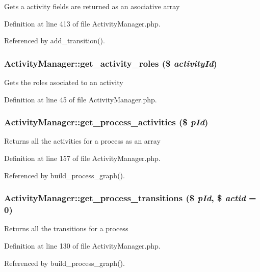 Gets a activity fields are returned as an asociative array 

Definition at line 413 of file Activity\-Manager.php.

Referenced by add\_\-transition().
\subsubsection{\setlength{\rightskip}{0pt plus 5cm}Activity\-Manager::get\_\-activity\_\-roles (\$ {\em activity\-Id})}\label{classActivityManager_a3}


Gets the roles asociated to an activity 

Definition at line 45 of file Activity\-Manager.php.
\subsubsection{\setlength{\rightskip}{0pt plus 5cm}Activity\-Manager::get\_\-process\_\-activities (\$ {\em p\-Id})}\label{classActivityManager_a11}


Returns all the activities for a process as an array 

Definition at line 157 of file Activity\-Manager.php.

Referenced by build\_\-process\_\-graph().
\subsubsection{\setlength{\rightskip}{0pt plus 5cm}Activity\-Manager::get\_\-process\_\-transitions (\$ {\em p\-Id}, \$ {\em actid} = 0)}\label{classActivityManager_a9}


Returns all the transitions for a process 

Definition at line 130 of file Activity\-Manager.php.

Referenced by build\_\-process\_\-graph().
